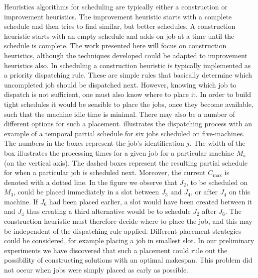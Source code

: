 \documentclass[smallextended]{svjour3}
\begin{document}
	Heuristics algorithms for scheduling are typically either a construction or improvement heuristics. The improvement heuristic starts with a complete schedule and then tries to find similar, but better schedules.
	A construction heuristic starts with an empty schedule and adds on job at a time until the schedule is complete.
	The work presented here will focus on construction heuristics, although the techniques developed could be adapted to improvement heuristics also. 
	In scheduling a construction heuristic is typically implemented as a priority dispatching rule. 
	These are simple rules that basically determine which uncompleted job should be dispatched next. 
	However, knowing which job to dispatch is not sufficient, one must also know where to place it. 
	In order to build tight schedules it would be sensible to place the jobs, once they become available, such that the machine idle time is minimal. 
	There may also be a number of different options for such a placement. 
	 illustrates the dispatching process with an example of a temporal partial schedule for six jobs scheduled on five-machines. 
	The numbers in the boxes represent the job's identification $j$. 
	The width of the box illustrates the processing times for a given job for a particular machine $M_a$ (on the vertical axis). 
	The dashed boxes represent the resulting partial schedule for when a particular job is scheduled next. 
	Moreover, the current $C_{\max}$ is denoted with a dotted line. 
	In the figure we observe that $J_2$, to be scheduled on $M_3$, could be placed immediately in a slot between $J_3$ and $J_4$, or after $J_4$ on this machine. 
	If $J_6$ had been placed earlier, a slot would have been created between it and $J_4$ thus creating a third alternative would be to schedule $J_2$ after $J_6$. 
	The construction heuristic must therefore decide where to place the job, and this may be independent of the dispatching rule applied. 
	Different placement strategies could be considered, for example placing a job in smallest slot. 
	In our preliminary experiments we have discovered that such a placement could rule out the possibility of constructing solutions with an optimal makespan. 
	This problem did not occur when jobs were simply placed as early as possible.
	
\end{document}
